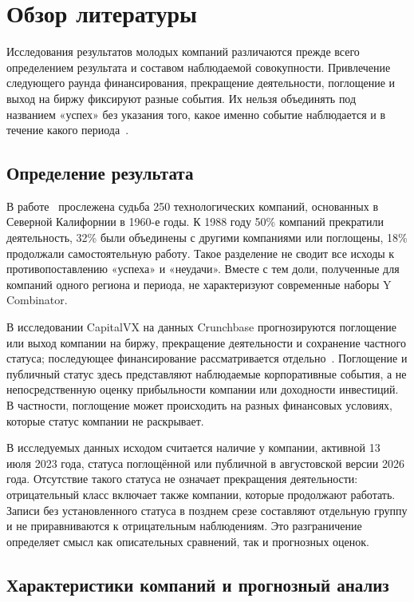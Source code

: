 \newpage

\section{Обзор литературы}
\label{sec:literature}

Исследования результатов молодых компаний различаются прежде всего определением результата и составом наблюдаемой совокупности. Привлечение следующего раунда финансирования, прекращение деятельности, поглощение и выход на биржу фиксируют разные события. Их нельзя объединять под названием «успех» без указания того, какое именно событие наблюдается и в течение какого периода~\cite{old-study,sharchilev2018,ross2021}.

\subsection{Определение результата}

В работе~\cite{old-study} прослежена судьба 250 технологических компаний, основанных в Северной Калифорнии в 1960-е годы. К 1988 году 50\% компаний прекратили деятельность, 32\% были объединены с другими компаниями или поглощены, 18\% продолжали самостоятельную работу. Такое разделение не сводит все исходы к противопоставлению «успеха» и «неудачи». Вместе с тем доли, полученные для компаний одного региона и периода, не характеризуют современные наборы Y Combinator.

В исследовании CapitalVX на данных Crunchbase прогнозируются поглощение или выход компании на биржу, прекращение деятельности и сохранение частного статуса; последующее финансирование рассматривается отдельно~\cite{ross2021}. Поглощение и публичный статус здесь представляют наблюдаемые корпоративные события, а не непосредственную оценку прибыльности компании или доходности инвестиций. В частности, поглощение может происходить на разных финансовых условиях, которые статус компании не раскрывает.

В исследуемых данных исходом считается наличие у компании, активной 13 июля 2023 года, статуса поглощённой или публичной в августовской версии 2026 года. Отсутствие такого статуса не означает прекращения деятельности: отрицательный класс включает также компании, которые продолжают работать. Записи без установленного статуса в позднем срезе составляют отдельную группу и не приравниваются к отрицательным наблюдениям. Это разграничение определяет смысл как описательных сравнений, так и прогнозных оценок.

\subsection{Характеристики компаний и прогнозный анализ}

